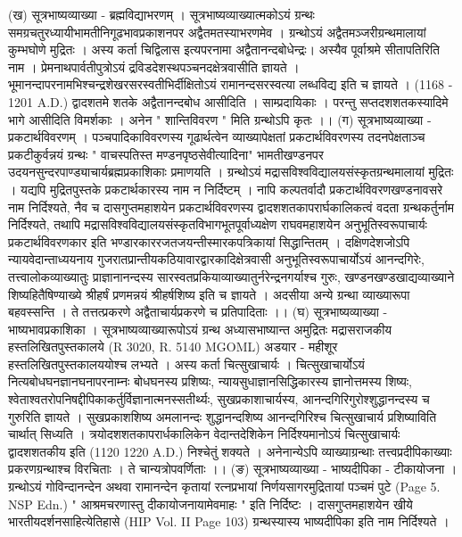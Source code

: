 (ख) सूत्रभाष्यव्याख्या - ब्रह्मविद्याभरणम् । 
सूत्रभाष्यव्याख्यात्मकोऽयं ग्रन्थः समग्रचतुरध्यायीभामतीनिगूढभावप्रकाशनपर अद्वैतमतस्याभरणमेव । ग्रन्थोऽयं अद्वैतमञ्जरीग्रन्थमालायां कुम्भघोणे मुद्रितः ।
अस्य कर्ता चिद्विलास इत्यपरनामा अद्वैतानन्दबोधेन्द्रः। अस्यैव पूर्वाश्रमे सीतापतिरिति नाम । प्रेमनाथपार्वतीपुत्रोऽयं द्रविडदेशस्थपञ्चनदक्षेत्रवासीति ज्ञायते । भूमानन्दापरनामभिश्चन्द्रशेखरसरस्वतीभिर्दीक्षितोऽयं रामानन्दसरस्वत्या लब्धविद्य इति च ज्ञायते । (1168 - 1201 A.D.) द्वादशतमे शतके अद्वैतानन्दबोध आसीदिति । साम्प्रदायिकाः । परन्तु सप्तदशशतकस्यादिमे भागे आसीदिति विमर्शकाः । अनेन " शान्तिविवरण " मिति ग्रन्थोऽपि कृतः ।। 
(ग) सूत्रभाष्यव्याख्या - प्रकटार्थविवरणम् । 
पञ्चपादिकाविवरणस्य गूढार्थत्वेन व्याख्यापेक्षतां प्रकटार्थविवरणस्य तदनपेक्षताञ्च प्रकटीकुर्वन्नयं ग्रन्थः " वाचस्पतिस्त मण्डनपृष्ठसेवीत्यादिना" भामतीखण्डनपर उदयनसुन्दरपाण्ड्याचार्यब्रह्मप्रकाशिकाः प्रमाणयति । ग्रन्थोऽयं मद्रासविश्वविद्यालयसंस्कृतग्रन्थमालायां मुद्रितः । 
यद्यपि मुद्रितपुस्तके प्रकटार्थकारस्य नाम न निर्दिष्टम् । नापि कल्पतर्वादौ प्रकटार्थविवरणखण्डनावसरे नाम निर्दिश्यते, नैव च दासगुप्तमहाशयेन प्रकटार्थविवरणस्य द्वादशशतकापरार्घकालिकत्वं वदता ग्रन्थकर्तुर्नाम निर्दिश्यते, तथापि मद्रासविश्वविद्यालयसंस्कृतविभागभूतपूर्वाध्यक्षेण राघवमहाशयेन अनुभूतिस्वरूपाचार्यः प्रकटार्थविवरणकार इति भण्डारकाररजतजयन्तीस्मारकपत्रिकायां सिद्धान्तितम् । 
दक्षिणदेशजोऽपि न्यायवेदान्ताध्ययनाय गुजरातप्रान्तीयकठियावारद्वारकादिक्षेत्रवासी अनुभूतिस्वरूपाचार्योऽयं आनन्दगिरेः, तत्त्वालोकव्याख्यातुः प्राज्ञानानन्दस्य सारस्वतप्रकियाव्याख्यातुर्नरेन्द्रनगर्याश्च गुरुः, खण्डनखण्डखाद्यव्याख्याने शिष्यहितैषिण्याख्ये श्रीहर्षं प्रणमन्नयं श्रीहर्षशिष्य इति च ज्ञायते । अदसीया अन्ये ग्रन्था व्याख्यारूपा बहवस्सन्ति । ते तत्तत्प्रकरणे अद्वैताचार्यप्रकरणे च प्रतिपादिताः ।।
(घ) सूत्रभाष्यव्याख्या - भाष्यभावप्रकाशिका ।
सूत्रभाष्यव्याख्यारूपोऽयं ग्रन्थ अध्यासभाष्यान्त अमुद्रितः मद्रासराजकीय हस्तलिखितपुस्तकालये (R 3020, R. 5140 MGOML) अडयार - महीशूर हस्तलिखितपुस्तकालययोश्च लभ्यते ।
अस्य कर्ता चित्सुखाचार्यः । चित्सुखाचार्योऽयं नित्यबोधघनज्ञानघनापरनाम्नः बोधघनस्य प्रशिष्यः, न्यायसुधाज्ञानसिद्धिकारस्य ज्ञानोत्तमस्य शिष्यः, श्वेताश्वतरोपनिषद्दीपिकाकर्तुर्विज्ञानात्मनस्सतीर्थ्यः, सुखप्रकाशाचार्यस्य, आनन्दगिरिगुरोश्शुद्धानन्दस्य च गुरुरिति ज्ञायते । सुखप्रकाशशिष्य अमलानन्दः शुद्धानन्दशिष्य आनन्दगिरिश्च चित्सुखाचार्य प्रशिष्याविति चार्थात् सिध्यति । त्रयोदशशतकापरार्धकालिकेन वेदान्तदेशिकेन निर्दिश्यमानोऽयं चित्सुखाचार्यः द्वादशशतकीय इति (1120 1220 A.D.) निश्चेतुं शक्यते । अनेनान्येऽपि व्याख्याग्रन्थाः तत्त्वप्रदीपिकाख्याः प्रकरणग्रन्थाश्च विरचिताः । ते चान्यत्रोपवर्णिताः ।। 
(ङ) सूत्रभाष्यव्याख्या - भाष्यदीपिका - टीकायोजना ।
ग्रन्थोऽयं गोविन्दानन्देन अथवा रामानन्देन कृतायां रत्नप्रभायां निर्णयसागरमुद्रितायां पञ्चमं पुटे (Page 5. NSP Edn.) " आश्रमचरणास्तु दीकायोजनायामेवमाहः " इति निर्दिष्टः । दासगुप्तमहाशयेन खीये भारतीयदर्शनसाहित्येतिहासे (HIP Vol. II Page 103) ग्रन्थस्यास्य भाष्यदीपिका इति नाम निर्दिश्यते । 

